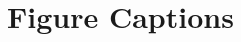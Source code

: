 \documentclass[preprint,5p,authoryear]{elsarticle}
\begin{document}





\pagebreak







\pagebreak

\section*{Figure Captions}
\end{document}
